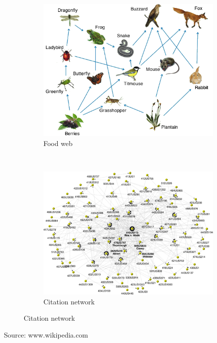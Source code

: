 \documentclass[10pt]{beamer}
\begin{document}
\begin{frame}
\begin{figure}[!h]
\begin{subfigure}[b]{0.3\textwidth}
		\end{subfigure}\\
		\begin{subfigure}[b]{0.3\textwidth}
			\includegraphics[width=\textwidth]{images/food-web-2.png}
			\caption{Food web}
		\end{subfigure}~
		\begin{subfigure}[b]{0.3\textwidth}
			\includegraphics[width= \textwidth]{images/citation.jpg}
			\caption{Citation network}
		\end{subfigure}
	\end{figure}
	Source: www.wikipedia.com
\end{frame}
\end{document}
